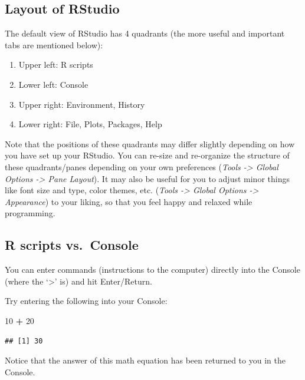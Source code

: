 \documentclass[
]{book}
\newenvironment{Shaded}{\begin{snugshade}}{\end{snugshade}}
\newcommand{\DecValTok}[1]{\textcolor[rgb]{0.00,0.00,0.81}{#1}}
\newcommand{\SpecialCharTok}[1]{\textcolor[rgb]{0.81,0.36,0.00}{\textbf{#1}}}
\providecommand{\tightlist}{%
  \setlength{\itemsep}{0pt}\setlength{\parskip}{0pt}}
\begin{document}
\subsection{Layout of RStudio}\label{layout-of-rstudio}

The default view of RStudio has 4 quadrants (the more useful and important tabs are mentioned below):

\begin{enumerate}
\def\labelenumi{\arabic{enumi}.}
\tightlist
\item
  Upper left: R scripts
\item
  Lower left: Console
\item
  Upper right: Environment, History
\item
  Lower right: File, Plots, Packages, Help
\end{enumerate}

Note that the positions of these quadrants may differ slightly depending on how you have set up your RStudio. You can re-size and re-organize the structure of these quadrants/panes depending on your own preferences (\emph{Tools -\textgreater{} Global Options -\textgreater{} Pane Layout}). It may also be useful for you to adjust minor things like font size and type, color themes, etc. (\emph{Tools -\textgreater{} Global Options -\textgreater{} Appearance}) to your liking, so that you feel happy and relaxed while programming.

\subsection{R scripts vs.~Console}\label{r-scripts-vs.-console}

You can enter commands (instructions to the computer) directly into the Console (where the `\textgreater{}' is) and hit Enter/Return.

Try entering the following into your Console:

\begin{Shaded}
\begin{Highlighting}[]
\DecValTok{10} \SpecialCharTok{+} \DecValTok{20}
\end{Highlighting}
\end{Shaded}

\begin{verbatim}
## [1] 30
\end{verbatim}

Notice that the answer of this math equation has been returned to you in the Console.
\end{document}
